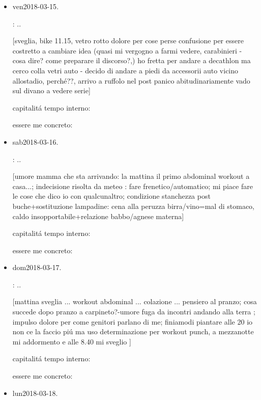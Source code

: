 \begin{itemize}
capitalit\'a tempo interno: 

essere me concreto:

\item{ven}{2018-03-15}.

: ..

[sveglia, bike 11.15, vetro rotto dolore per cose perse confusione per essere costretto a cambiare idea (quasi mi vergogno a farmi vedere, carabinieri - cosa dire? come preparare il discorso?,) ho fretta per andare a decathlon ma cerco colla vetri auto - decido di andare a piedi da accessorii auto vicino allostadio, perch\'e??, arrivo a ruffolo nel post panico abitudinariamente vado sul divano a vedere serie]

capitalit\'a tempo interno:

essere me concreto: 

\item{sab}{2018-03-16}.

: ..

[umore mamma che sta arrivando: la mattina il primo abdominal workout a casa...; indecisione risolta da meteo : fare frenetico/automatico; mi piace fare le cose che dico io con qualcunaltro; condizione stanchezza post buche+sostituzione lampadine: cena alla peruzza birra/vino=mal di stomaco, caldo insopportabile+relazione babbo/agnese materna]

capitalit\'a tempo interno:

essere me concreto: 

\item{dom}{2018-03-17}.

: ..

[mattina sveglia ... workout abdominal ... colazione ... pensiero al pranzo; cosa succede dopo pranzo a carpineto?-umore fuga da incontri andando alla terra ;  impulso dolore per come genitori parlano di me; finiamodi piantare alle 20 io non ce la faccio pi\'u ma uso determinazione per workout punch, a mezzanotte mi addormento e alle 8.40 mi sveglio
]

capitalit\'a tempo interno:

essere me concreto: 

\item{lun}{2018-03-18}.


\end{itemize}
